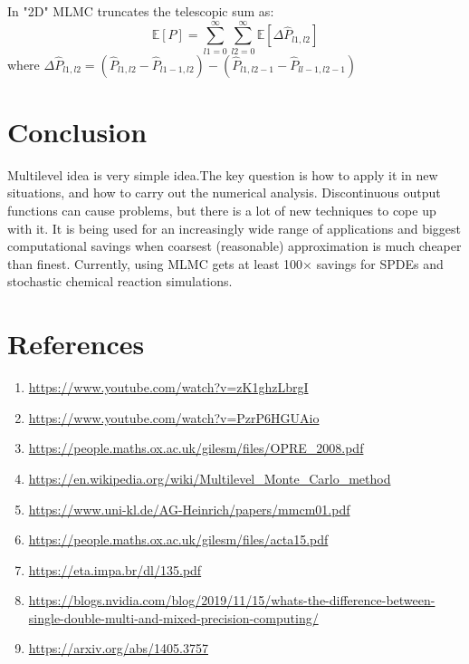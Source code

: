 \documentclass[12pt]{article}
\newcommand{\E}{\mathbb{E}}
\begin{document}
In "2D" MLMC truncates the telescopic sum as:
\begin{equation} \E[P] = \sum_{l1=0}^{\infty}\sum_{l2=0}^{\infty}\E[\Delta\hat{P}_{l1,l2}] \end{equation}
where $\Delta\hat{P}_{l1,l2} = (\hat{P}_{l1,l2} - \hat{P}_{l1-1,l2} )-(\hat{P}_{l1,l2-1} - \hat{P}_{ll-1,l2-1} )$

\section{Conclusion}
Multilevel idea is very simple idea.The key question is how to apply it in new situations, and how to carry out the numerical analysis. Discontinuous output functions can cause problems, but there is a lot of new techniques to cope up with it. It is being used for an increasingly wide range of applications and biggest computational savings when coarsest (reasonable) approximation is much cheaper than finest. Currently, using MLMC gets at least 100× savings for SPDEs and stochastic chemical reaction simulations.

\section{References}
\begin{enumerate}[label=\alph*]
\item \url{https://www.youtube.com/watch?v=zK1ghzLbrgI}
\item \url{https://www.youtube.com/watch?v=PzrP6HGUAio}
\item \url{https://people.maths.ox.ac.uk/gilesm/files/OPRE_2008.pdf}
\item \url{https://en.wikipedia.org/wiki/Multilevel_Monte_Carlo_method}
\item \url{https://www.uni-kl.de/AG-Heinrich/papers/mmcm01.pdf}
\item \url{https://people.maths.ox.ac.uk/gilesm/files/acta15.pdf}
\item \url{https://eta.impa.br/dl/135.pdf}
\item \url{https://blogs.nvidia.com/blog/2019/11/15/whats-the-difference-between-single-double-multi-and-mixed-precision-computing/}
\item \url{https://arxiv.org/abs/1405.3757}
\end{enumerate}
\end{document}
